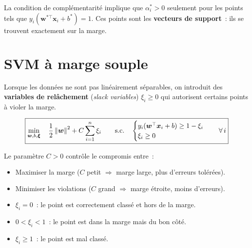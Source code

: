 \begin{remarque}
La condition de compl\'ementarit\'e implique que $\alpha_i^* > 0$ seulement
pour les points tels que $y_i(\bm{w}^{*\top}\bm{x}_i + b^*) = 1$. Ces points
sont les \textbf{vecteurs de support}~: ils se
trouvent exactement sur la marge.
\end{remarque}

\section{SVM \`a marge souple}
\label{sec:soft-margin}

Lorsque les donn\'ees ne sont pas lin\'eairement s\'eparables, on introduit des
\textbf{variables de rel\^achement} (\emph{slack variables}) $\xi_i \geq 0$
qui autorisent certains points \`a violer la marge.

\begin{formules}[title=\textbf{SVM \`a marge souple (primal)}]
\begin{equation}
\boxed{
  \min_{\bm{w}, b, \bm{\xi}} \quad \frac{1}{2}\left\| \bm{w} \right\|^2
  + C \sum_{i=1}^n \xi_i
  \qquad \text{s.c.} \quad
  \begin{cases}
    y_i(\bm{w}^\top\bm{x}_i + b) \geq 1 - \xi_i \\
    \xi_i \geq 0
  \end{cases}
  \quad \forall\, i
}
\label{eq:soft-svm}
\end{equation}
\end{formules}

\begin{definition}
Le param\`etre $C > 0$ contr\^ole le compromis entre~:
\begin{itemize}
  \item Maximiser la marge ($C$ petit $\Rightarrow$ marge large, plus d'erreurs
    tol\'er\'ees).
  \item Minimiser les violations ($C$ grand $\Rightarrow$ marge \'etroite,
    moins d'erreurs).
\end{itemize}
\end{definition}

\begin{attention}[title=\textbf{Interpr\'etation de $\xi_i$}]
\begin{itemize}
  \item $\xi_i = 0$~: le point est correctement class\'e et hors de la marge.
  \item $0 < \xi_i < 1$~: le point est dans la marge mais du bon c\^ot\'e.
  \item $\xi_i \geq 1$~: le point est mal class\'e.
\end{itemize}
\end{attention}

